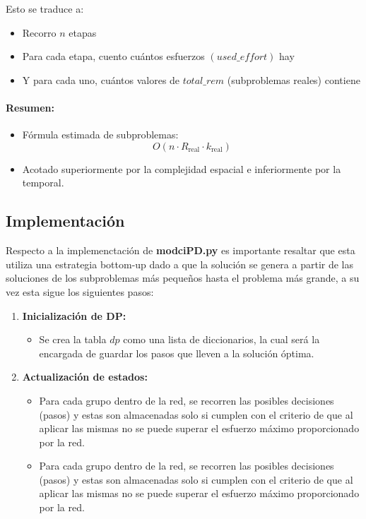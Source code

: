 \documentclass[11pt,letter]{article}
\begin{document}
\begin{itemize}
Esto se traduce a:
\begin{itemize}
    \item Recorro $n$ etapas
    \item Para cada etapa, cuento cuántos esfuerzos $(used\_effort)$ hay
    \item Y para cada uno, cuántos valores de $total\_rem$ (subproblemas reales) contiene
\end{itemize}

\paragraph{Resumen:}
\begin{itemize}
    \item Fórmula estimada de subproblemas:
    \[
        O(n \cdot R_{\text{real}} \cdot k_{\text{real}})
    \]
    \item Acotado superiormente por la complejidad espacial e inferiormente por la temporal.
\end{itemize}



\subsection{Implementación}
Respecto a la implemenctación de \textbf{modciPD.py} es importante resaltar que esta utiliza una estrategia bottom-up dado a que la solución se genera  a partir de las soluciones de los subproblemas más pequeños hasta el problema más grande, a su vez esta sigue los siguientes pasos:
\begin{enumerate}


\item \textbf{Inicialización de DP:}
\begin{itemize}
    \item Se crea la tabla $dp$ como una lista de diccionarios, la cual será la encargada de guardar los pasos que lleven a la solución óptima.


\end{itemize}

\item \textbf{Actualización de estados:}
\begin{itemize}
    \item Para cada grupo dentro de la red, se recorren las posibles decisiones (pasos) y estas son almacenadas solo si cumplen con el criterio de que al aplicar las mismas no se puede superar el esfuerzo máximo proporcionado por la red.
    \item Para cada grupo dentro de la red, se recorren las posibles decisiones (pasos) y estas son almacenadas solo si cumplen con el criterio de que al aplicar las mismas no se puede superar el esfuerzo máximo proporcionado por la red.
\end{itemize}


\end{enumerate}
\end{itemize}
\end{document}
